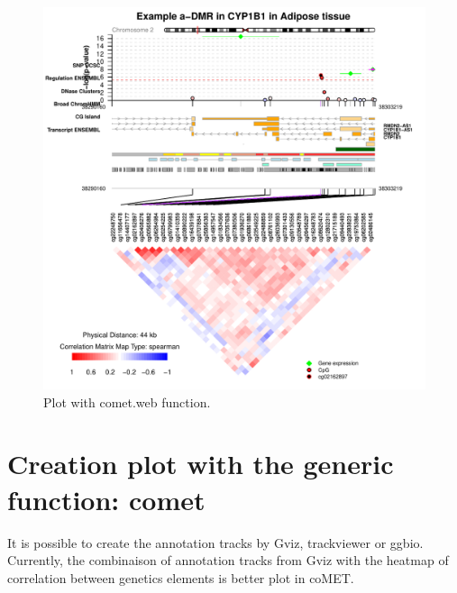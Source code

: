 \documentclass[11pt]{article}\usepackage[]{graphicx}\usepackage[usenames,dvipsnames]{color}
\makeatletter
\def\maxwidth{ %
  \ifdim\Gin@nat@width>\linewidth
    \linewidth
  \else
    \Gin@nat@width
  \fi
}
\newenvironment{knitrout}{}{} %
\makeatother
\begin{document}
\begin{figure}
\begin{knitrout}
\color{fgcolor}

{\centering \includegraphics[width=\maxwidth]{figure/minimal-cometwebPlot} 

}



\end{knitrout}
\caption{Plot with comet.web function.\label{fig:cometweb_simple}}
\end{figure}

\section{Creation plot with the generic function: comet}
It is possible to create the annotation tracks by Gviz, trackviewer or ggbio.
Currently, the combinaison of annotation tracks from Gviz with the heatmap of correlation between genetics elements is better plot in coMET.
\end{document}
